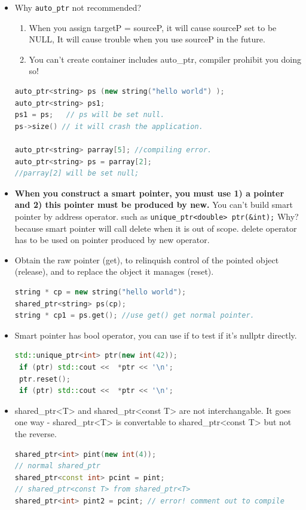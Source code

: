 \documentclass[a4paper,11pt,twoside]{book}
\begin{document}
\begin{itemize}
\item Why \texttt{auto\_ptr} not recommended? 
\begin{enumerate}
	\item When you assign targetP = sourceP, it will cause sourceP set to be NULL, It will cause trouble when you use sourceP in the future. 
	\item You can't create container includes auto\_ptr, compiler prohibit you doing so!
\end{enumerate}
\begin{lstlisting}[frame=single, language=c++]
auto_ptr<string> ps (new string("hello world") );
auto_ptr<string> ps1;
ps1 = ps;   // ps will be set null.
ps->size() // it will crash the application.

auto_ptr<string> parray[5]; //compiling error.
auto_ptr<string> ps = parray[2];
//parray[2] will be set null;
\end{lstlisting}

\item \textbf{When you construct a smart pointer, you must use 1) a pointer and 2) this pointer must be produced by new.} You can't build smart pointer by address operator. such as \texttt{unique\_ptr<double> ptr(\&int);}   Why? because smart pointer will call delete when it is out of scope.  delete operator has to be used on pointer produced by new operator.

\item Obtain the raw pointer (get), to relinquish control of the pointed object (release), and to replace the object it manages (reset).
\begin{lstlisting}[frame=single, language=c++]
string * cp = new string("hello world");
shared_ptr<string> ps(cp);
string * cp1 = ps.get(); //use get() get normal pointer.
\end{lstlisting}


\item Smart pointer has bool operator, you can use if to test if it's nullptr directly.
\begin{lstlisting}[frame=single, language=c++]
 std::unique_ptr<int> ptr(new int(42));
 if (ptr) std::cout <<  *ptr << '\n';
 ptr.reset();
 if (ptr) std::cout <<  *ptr << '\n';
\end{lstlisting}

\item shared\_ptr<T> and shared\_ptr<const T> are not interchangable. It goes one way - shared\_ptr<T> is convertable to shared\_ptr<const T> but not the reverse.
\begin{lstlisting}[frame=single, language=c++]
shared_ptr<int> pint(new int(4)); 
// normal shared_ptr
shared_ptr<const int> pcint = pint; 
// shared_ptr<const T> from shared_ptr<T>
shared_ptr<int> pint2 = pcint; // error! comment out to compile
\end{lstlisting}


\end{itemize}
\end{document}
